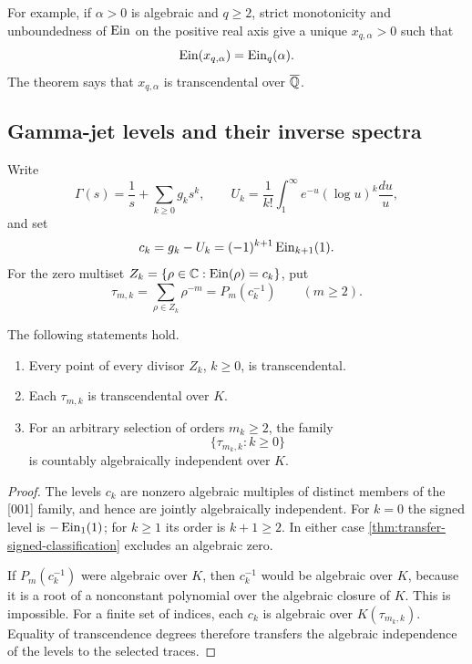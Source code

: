For example, if \(\alpha>0\) is algebraic and \(q\ge2\), strict
monotonicity and unboundedness of \(\operatorname{Ein}\) on the positive real axis give
a unique \(x_{q,\alpha}>0\) such that
\[
 \operatorname{Ein}(x_{q,\alpha})=\operatorname{Ein}_q(\alpha).
\]
The theorem says that \(x_{q,\alpha}\) is transcendental over \(\overline{\mathbb Q}\).

\subsection{Gamma-jet levels and their inverse spectra}

Write
\[
 \Gamma(s)=\frac1s+\sum_{k\ge0}g_ks^k,
 \qquad
 U_k=\frac1{k!}\int_1^\infty
 e^{-u}(\log u)^k\frac{du}{u},
\]
and set
\[
 c_k=g_k-U_k=(-1)^{k+1}\operatorname{Ein}_{k+1}(1).
\]
For the zero multiset
\(Z_k=\{\rho\in\mathbb C:\operatorname{Ein}(\rho)=c_k\}\), put
\[
 \tau_{m,k}=\sum_{\rho\in Z_k}\rho^{-m}=P_m(c_k^{-1})
 \qquad(m\ge2).
\]

\begin{theorem}
\label{thm:transfer-gamma-divisors}
The following statements hold.
\begin{enumerate}
\item Every point of every divisor \(Z_k\), \(k\ge0\), is
transcendental.
\item Each \(\tau_{m,k}\) is transcendental over \(K\).
\item For an arbitrary selection of orders \(m_k\ge2\), the family
\[
 \{\tau_{m_k,k}:k\ge0\}
\]
is countably algebraically independent over \(K\).
\end{enumerate}
\end{theorem}

\begin{proof}
The levels \(c_k\) are nonzero algebraic multiples of distinct members of
the [001] family, and hence are jointly algebraically independent.  For
\(k=0\) the signed level is \(-\operatorname{Ein}_1(1)\); for \(k\ge1\) its order is
\(k+1\ge2\).  In either case
\cref{thm:transfer-signed-classification} excludes an algebraic zero.

If \(P_m(c_k^{-1})\) were algebraic over \(K\), then \(c_k^{-1}\) would
be algebraic over \(K\), because it is a root of a nonconstant polynomial
over the algebraic closure of \(K\).  This is impossible.  For a finite
set of indices, each \(c_k\) is algebraic over
\(K(\tau_{m_k,k})\).  Equality of transcendence degrees therefore transfers
the algebraic independence of the levels to the selected traces.
\end{proof}

